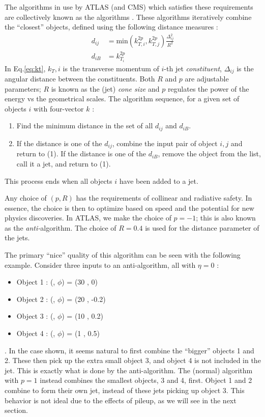 The algorithms in use by ATLAS (and CMS) which satisfies these requirements are collectively known as the \kt algorithms \cite{Ellis:1993tq,Cacciari:2005hq,Cacciari:2008gp}.
These algorithms iteratively combine the ``closest'' objects, defined using the following distance measures :
\begin{equation}
\begin{aligned}\label{eq:kt}
d_{ij} &= \text{min}(k_{T,i}^{2p} , k_{T,j}^{2p} )  \frac{\Delta_{ij}^2 }{R^2} \\
d_{iB} &= k_{T_i}^{2p}
\end{aligned}
\end{equation}
In Eq.\ref{eq:kt}, $k_T,i$ is the transverse momentum of $i$-th jet \textit{constituent}, $\Delta_{ij}$ is the angular distance between the constituents.
Both $R$ and $p$ are adjustable parameters; $R$ is known as the (jet) \textit{cone size} and $p$ regulates the power of the energy vs the geometrical scales.
The algorithm sequence, for a given set of objects $i$ with four-vector $k$ :
\begin{enumerate}
\item Find the minimum distance in the set of all $d_{ij}$ and $d_{iB}$.
\item If the distance is one of the $d_{ij}$, combine the input pair of object $i,j$ and return to (1).
If the distance is one of the $d_{iB}$, remove the object from the list, call it a jet, and return to (1).
\end{enumerate}
This process ends when all objects $i$ have been added to a jet.

Any choice of $(p,R)$ has the requirements of collinear and radiative safety.
In essence, the choice is then to optimize based on speed and the potential for new physics discoveries.
In ATLAS, we make the choice of $p = -1$; this is also known as the \textit{anti-}\kt algorithm.
The choice of $R = 0.4$ is used for the distance parameter of the jets.

The primary ``nice'' quality of this algorithm can be seen with the following example.
Consider three inputs to an anti-\kt algorithm, all with $\eta = 0$ :
\begin{itemize}
\item Object 1 : (\pt, $\phi$) = (30 \GeV, 0)
\item Object 2 : (\pt, $\phi$) = (20 \GeV, -0.2)
\item Object 3 : (\pt, $\phi$) = (10 \GeV, 0.2)
\item Object 4 : (\pt, $\phi$) = (1  \GeV, 0.5)
\end{itemize}.
In the case shown, it seems natural to first combine the ``bigger'' objects 1 and 2.
These then pick up the extra small object 3, and object 4 is not included in the jet.
This is exactly what is done by the anti-\kt algorithm.
The (normal) \kt algorithm with $p = 1$ instead combines the smallest objects, 3 and 4, first.
Object 1 and 2 combine to form their own jet, instead of these jets picking up object 3.
This behavior is not ideal due to the effects of pileup, as we will see in the next section.

